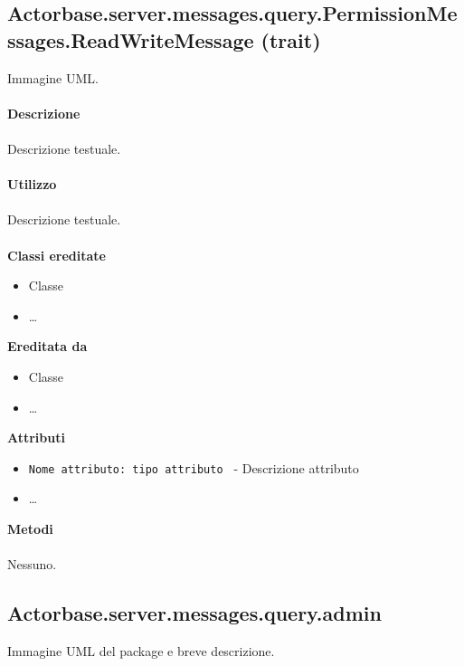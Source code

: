 \documentclass[a4paper]{article}
\begin{document}
\subsection{Actorbase.server.messages.query.PermissionMessages.ReadWriteMessage (trait)}
		Immagine UML.
		\\ \\
		\textbf{Descrizione}
			\\ \\
			Descrizione testuale.
			\\ \\
		\textbf{Utilizzo}
			\\ \\
			Descrizione testuale.
			\\ \\
		\textbf{Classi ereditate}
			\begin{itemize}
				\item Classe
				\item \dots
			\end{itemize}
		\textbf{Ereditata da}
			\begin{itemize}
				\item Classe
				\item \dots
			\end{itemize}
		\textbf{Attributi}
			\begin{itemize}
				\item \texttt{Nome attributo: tipo attributo } - Descrizione attributo
				\item \dots
			\end{itemize}
		\textbf{Metodi}
			\\ \\
			Nessuno.
			
	\subsection{Actorbase.server.messages.query.admin}
		Immagine UML del package e breve descrizione.
		
\end{document}
